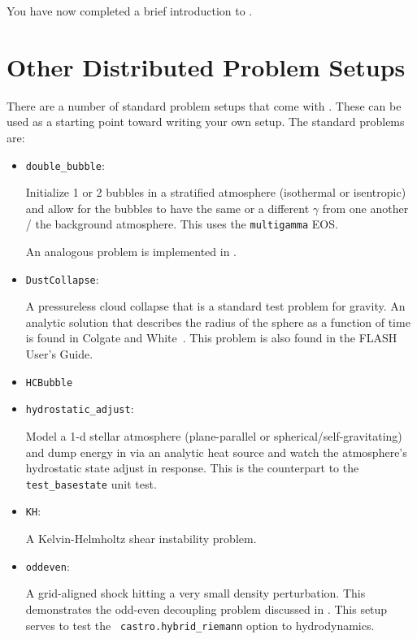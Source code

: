 You have now completed a brief introduction to \castro. 


\section{Other Distributed Problem Setups}

There are a number of standard problem setups that come with \castro.
These can be used as a starting point toward writing your own setup.
The standard problems are:
\begin{itemize}

\item {\tt double\_bubble}:

  Initialize 1 or 2 bubbles in a stratified atmosphere (isothermal or
  isentropic) and allow for the bubbles to have the same or a
  different $\gamma$ from one another / the background atmosphere.  This
  uses the {\tt multigamma} EOS.

  An analogous problem is implemented in \maestro.
    
\item {\tt DustCollapse}:

  A pressureless cloud collapse that is a standard test problem for
  gravity.  An analytic solution that describes the radius of the
  sphere as a function of time is found in Colgate and
  White~\cite{colgwhite}.  This problem is also found in the FLASH
  User's Guide.
  
  
\item {\tt HCBubble}
  
\item {\tt hydrostatic\_adjust}:

  Model a 1-d stellar atmosphere (plane-parallel or
  spherical/self-gravitating) and dump energy in via an analytic heat
  source and watch the atmosphere's hydrostatic state adjust in
  response.  This is the counterpart to the \maestro\ {\tt
    test\_basestate} unit test.

\item {\tt KH}:

  A Kelvin-Helmholtz shear instability problem.
  
\item {\tt oddeven}:

  A grid-aligned shock hitting a very small density perturbation.
  This demonstrates the odd-even decoupling problem discussed in
  \cite{quick1997}.  This setup serves to test the {\tt
    castro.hybrid\_riemann} option to hydrodynamics.
  

\end{itemize}
